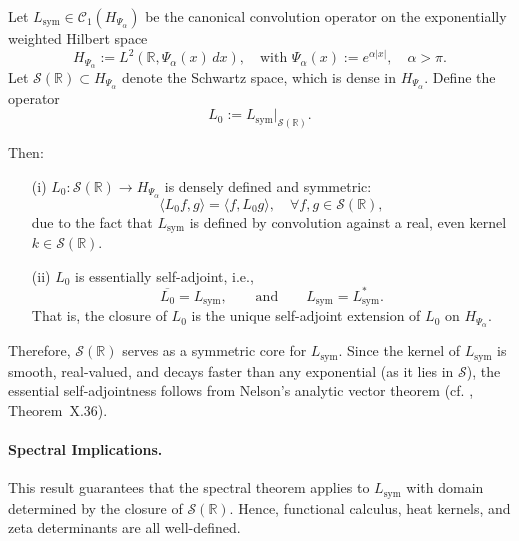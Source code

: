 \begin{lemma}
\label{lem:core-essential-selfadjointness}
Let \( L_{\mathrm{sym}} \in \mathcal{C}_1(H_{\Psi_\alpha}) \) be the canonical convolution operator on the exponentially weighted Hilbert space
\[
H_{\Psi_\alpha} := L^2(\mathbb{R}, \Psi_\alpha(x)\, dx), \quad \text{with } \Psi_\alpha(x) := e^{\alpha |x|}, \quad \alpha > \pi.
\]
Let \( \mathcal{S}(\mathbb{R}) \subset H_{\Psi_\alpha} \) denote the Schwartz space, which is dense in \( H_{\Psi_\alpha} \). Define the operator
\[
L_0 := L_{\mathrm{sym}}|_{\mathcal{S}(\mathbb{R})}.
\]

Then:
\begin{enumerate}
  \item[\textnormal{(i)}] \( L_0 \colon \mathcal{S}(\mathbb{R}) \to H_{\Psi_\alpha} \) is densely defined and symmetric:
  \[
  \langle L_0 f, g \rangle = \langle f, L_0 g \rangle, \quad \forall f, g \in \mathcal{S}(\mathbb{R}),
  \]
  due to the fact that \( L_{\mathrm{sym}} \) is defined by convolution against a real, even kernel \( k \in \mathcal{S}(\mathbb{R}) \).

  \item[\textnormal{(ii)}] \( L_0 \) is essentially self-adjoint, i.e.,
  \[
  \overline{L_0} = L_{\mathrm{sym}}, \qquad \text{and} \qquad L_{\mathrm{sym}} = L_{\mathrm{sym}}^*.
  \]
  That is, the closure of \( L_0 \) is the unique self-adjoint extension of \( L_0 \) on \( H_{\Psi_\alpha} \).
\end{enumerate}

\medskip
\noindent
Therefore, \( \mathcal{S}(\mathbb{R}) \) serves as a symmetric core for \( L_{\mathrm{sym}} \). Since the kernel of \( L_{\mathrm{sym}} \) is smooth, real-valued, and decays faster than any exponential (as it lies in \( \mathcal{S} \)), the essential self-adjointness follows from Nelson's analytic vector theorem (cf. \cite{ReedSimon1975II}, Theorem~X.36).

\paragraph{Spectral Implications.}
This result guarantees that the spectral theorem applies to \( L_{\mathrm{sym}} \) with domain determined by the closure of \( \mathcal{S}(\mathbb{R}) \). Hence, functional calculus, heat kernels, and zeta determinants are all well-defined.
\end{lemma}

